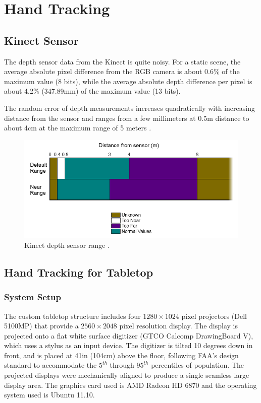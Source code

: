 \chapter{Hand Tracking}

\section{Kinect Sensor}
The depth sensor data from the Kinect is quite noisy. For a static scene, the
average absolute pixel difference from the RGB camera is about 0.6\% of the maximum value (8
bits), while the average absolute depth difference per pixel is about 4.2\%
(347.89mm) of the maximum value (13 bits).

The random error of depth measurements increases quadratically with increasing distance from the 
sensor and ranges from a few millimeters at 0.5m distance to about 4cm
at the maximum range of 5 meters \cite{khoshelham2011}.

\begin{figure}[h]
\centering
\includegraphics[width=\textwidth]{figures/kinect_sensor_range.png}
\caption{Kinect depth sensor range \cite{microsoft-kinect}.}
\end{figure}

\section{Hand Tracking for Tabletop}
\subsection{System Setup}
The custom tabletop structure includes four $1280\times1024$ pixel projectors 
(Dell 5100MP) that provide a $2560\times2048$ pixel resolution display. The
display is projected onto a flat white surface digitizer (GTCO Calcomp DrawingBoard V), 
which uses a stylus as an input device. The digitizer is tilted 10 degrees down 
in front, and is placed at 41in (104cm) above the floor, following FAA's design 
standard to accommodate the $5^{th}$ through $95^{th}$ percentiles of 
population. The projected displays were mechanically aligned to produce a single 
seamless large display area. The graphics card used is AMD
Radeon HD 6870 and the operating system used is Ubuntu 11.10.

